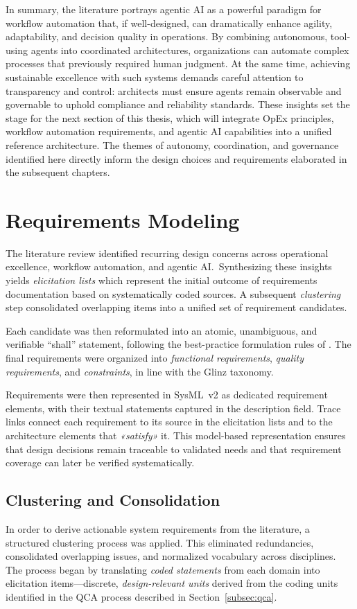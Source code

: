 In summary, the literature portrays agentic AI as a powerful paradigm for workflow automation that, if well-designed, can dramatically enhance agility, adaptability, and decision quality in operations. By combining autonomous, tool-using agents into coordinated architectures, organizations can automate complex processes that previously required human judgment. At the same time, achieving sustainable excellence with such systems demands careful attention to transparency and control: architects must ensure agents remain observable and governable to uphold compliance and reliability standards. These insights set the stage for the next section of this thesis, which will integrate OpEx principles, workflow automation requirements, and agentic AI capabilities into a unified reference architecture. The themes of autonomy, coordination, and governance identified here directly inform the design choices and requirements elaborated in the subsequent chapters.

\section{Requirements Modeling}\label{sec:mod-req}
The literature review identified recurring design concerns across operational excellence, workflow automation, and agentic AI.~Synthesizing these insights yields \emph{elicitation lists} which represent the initial outcome of requirements documentation based on systematically coded sources. A subsequent \emph{clustering} step consolidated overlapping items into a unified set of requirement candidates.

Each candidate was then reformulated into an atomic, unambiguous, and verifiable “shall” statement, following the best-practice formulation rules of \textcite{glinzHandbook2020}. The final requirements were organized into \emph{functional requirements}, \emph{quality requirements}, and \emph{constraints}, in line with the Glinz taxonomy.

Requirements were then represented in SysML~v2 as dedicated requirement elements, with their textual statements captured in the description field. Trace links connect each requirement to its source in the elicitation lists and to the architecture elements that \emph{«satisfy»} it. This model-based representation ensures that design decisions remain traceable to validated needs and that requirement coverage can later be verified systematically. \\

\subsection{Clustering and Consolidation}
In order to derive actionable system requirements from the literature, a structured clustering process was applied. This eliminated redundancies, consolidated overlapping issues, and normalized vocabulary across disciplines. The process began by translating \emph{coded statements} from each domain into elicitation items—discrete, \emph{design-relevant units} derived from the coding units identified in the QCA process described in Section~\ref{subsec:qca}.~\\

